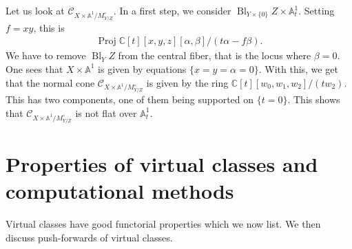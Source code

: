 \documentclass[pdftex]{sigma}
\numberwithin{equation}{section}
\newcommand{\Proj}{\operatorname{Proj}}
\theoremstyle{plain}
\theoremstyle{definition}
\theoremstyle{remark}
\begin{document}
\begin{Remark}Let us look at $\mathcal C_{X\times\mathbb A^1/M_{Y/Z}^\circ}$. In a first step, we consider $\operatorname{Bl}_{Y\times\{0\}}Z\times\mathbb A^1_t$. Setting $f=xy$, this is \begin{gather*}\Proj \mathbb C[t][x,y,z][\alpha,\beta]/(t\alpha-f\beta).\end{gather*} We have to remove $\operatorname{Bl}_{Y}Z$ from the central fiber, that is the locus where $\beta=0$. One sees that $X\times \mathbb A^1$ is given by equations $\{x=y=\alpha=0\}$. With this, we get that the normal cone $\mathcal C_{X\times\mathbb A^1/M_{Y/Z}^\circ}$ is given by the ring $\mathbb C[t][w_0,w_1,w_2]/(tw_2)$. This has two components, one of them being supported on $\{t=0\}$. This shows that $\mathcal C_{X\times\mathbb A^1/M_{Y/Z}^\circ}$ is not flat over $\mathbb A^1_t$.
\end{Remark}

\section{Properties of virtual classes and computational methods}\label{properties}

Virtual classes have good functorial properties which we now list. We then discuss push-forwards of virtual classes.
\end{document}
